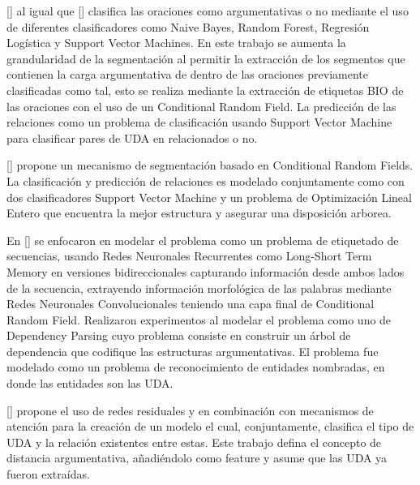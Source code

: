 
[\cite{goudas2015argument}] al igual que [\cite{palau2009argumentation}] clasifica las oraciones como
argumentativas o no mediante el uso de diferentes clasificadores como Naive Bayes, Random Forest, Regresión
Logística y Support Vector Machines. En este trabajo se aumenta la grandularidad de la segmentación al permitir
la extracción de los segmentos que contienen la carga argumentativa de dentro de las oraciones previamente clasificadas
como tal, esto se realiza mediante la extracción de etiquetas BIO de las oraciones con el uso de un 
Conditional Random Field. La predicción de las relaciones como un problema de clasificación
usando Support Vector Machine para clasificar pares de UDA en relacionados o no.

[\cite{stab2017parsing}] propone un mecanismo de segmentación basado en Conditional Random Fields. La clasificación
y predicción de relaciones es modelado conjuntamente como con dos clasificadores Support Vector Machine y un problema
de Optimización Lineal Entero que encuentra la mejor estructura y asegurar una disposición arborea. 

En [\cite{eger2017neural}] se enfocaron en
modelar el problema como un problema de etiquetado de secuencias, usando Redes Neuronales Recurrentes como 
Long-Short Term Memory en versiones bidireccionales capturando información desde ambos lados de la secuencia,
extrayendo información morfológica de las palabras mediante Redes Neuronales Convolucionales teniendo una capa final de
Conditional Random Field. Realizaron experimentos al modelar el problema como uno de Dependency Parsing cuyo problema
consiste en construir un árbol de dependencia que codifique las estructuras argumentativas. El problema fue modelado
como un problema de reconocimiento de entidades nombradas, en donde las entidades son las UDA.

[\cite{galassi2018argumentative}] propone el uso de redes residuales y en combinación con mecanismos de atención
para la creación de un modelo el cual, conjuntamente, clasifica el tipo de UDA y la relación existentes entre estas.
Este trabajo defina el concepto de distancia argumentativa, añadiéndolo como feature y asume que las UDA ya fueron 
extraídas.


